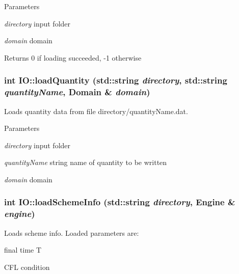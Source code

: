 \begin{DoxyParams}{Parameters}
\item[{\em directory}]input folder \item[{\em domain}]domain\end{DoxyParams}
\begin{DoxyReturn}{Returns}
0 if loading succeeded, -\/1 otherwise 
\end{DoxyReturn}
\hypertarget{namespaceIO_a0b5a994855e5e391320a431095d66400}{
\subsubsection[{loadQuantity}]{\setlength{\rightskip}{0pt plus 5cm}int IO::loadQuantity (std::string {\em directory}, \/  std::string {\em quantityName}, \/  {\bf Domain} \& {\em domain})}}
\label{namespaceIO_a0b5a994855e5e391320a431095d66400}


Loads quantity data from file directory/quantityName.dat. 
\begin{DoxyParams}{Parameters}
\item[{\em directory}]input folder \item[{\em quantityName}]string name of quantity to be written \item[{\em domain}]domain \end{DoxyParams}
\hypertarget{namespaceIO_acc60681d98975d0ce0d3580de4f70ecd}{
\subsubsection[{loadSchemeInfo}]{\setlength{\rightskip}{0pt plus 5cm}int IO::loadSchemeInfo (std::string {\em directory}, \/  {\bf Engine} \& {\em engine})}}
\label{namespaceIO_acc60681d98975d0ce0d3580de4f70ecd}


Loads scheme info. Loaded parameters are:
\begin{DoxyItemize}
\item final time T
\item CFL condition
\end{DoxyItemize}


